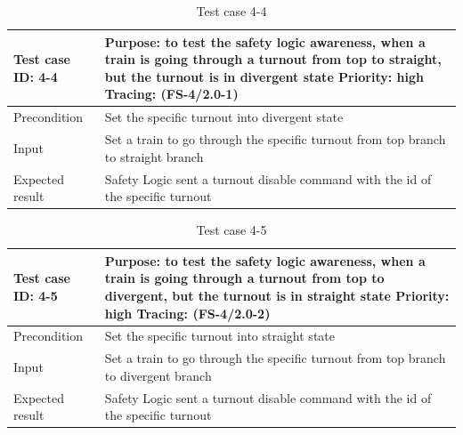 \begin{table}[H]
	\caption{Test case 4-4}
	\label{table:TCase-FS4-4}
	\begin{center}
		\renewcommand{\arraystretch}{1.8}
		\begin{tabu} 
			to 0.9 \textwidth
			{  X[0.3, l] X[l] }
			\toprule
			Test case ID: 4-4 & Purpose: to test the safety logic awareness, when a train is going through a turnout from top to straight, but the turnout is in divergent state \newline Priority: high \newline Tracing: (FS-4/2.0-1) \\ \midrule
			Precondition      & Set the specific turnout into divergent state                                                                                                                                                           \\
			Input             & Set a train to go through the specific turnout from top branch to straight branch                                                                                                                       \\
			Expected result   & Safety Logic sent a turnout disable command with the id of the specific turnout                                                                                                                         \\ \bottomrule
		\end{tabu}
	\end{center}
\end{table} 



\begin{table}[H]
	\caption{Test case 4-5}
	\label{table:TCase-FS4-5}
	\begin{center}
		\renewcommand{\arraystretch}{1.8}
		\begin{tabu} 
			to 0.9 \textwidth
			{  X[0.3, l] X[l] }
			\toprule
			Test case ID: 4-5 & Purpose: to test the safety logic awareness, when a train is going through a turnout from top to divergent, but the turnout is in straight state \newline Priority: high \newline Tracing: (FS-4/2.0-2) \\ \midrule
			Precondition      & Set the specific turnout into straight state                                                                                                                                                            \\
			Input             & Set a train to go through the specific turnout from top branch to divergent branch                                                                                                                      \\
			Expected result   & Safety Logic sent a turnout disable command with the id of the specific turnout                                                                                                                         \\ \bottomrule
		\end{tabu}
	\end{center}
\end{table} 


